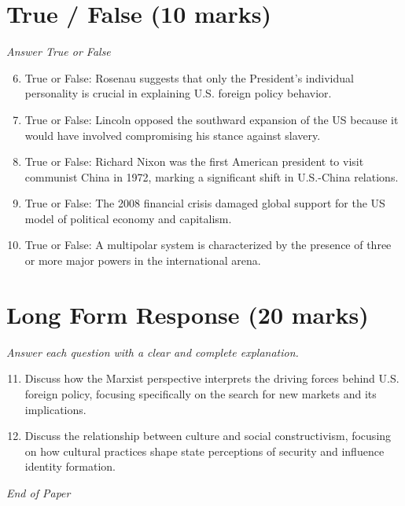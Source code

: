 \documentclass[12pt]{article}
\begin{document}
\section*{True / False (10 marks)}
\textit{Answer True or False}
\begin{enumerate}[label=\arabic*.]
\setcounter{enumi}{5}
\item True or False: Rosenau suggests that only the President's individual personality is crucial in explaining U.S. foreign policy behavior.
\item True or False: Lincoln opposed the southward expansion of the US because it would have involved compromising his stance against slavery.
\item True or False: Richard Nixon was the first American president to visit communist China in 1972, marking a significant shift in U.S.-China relations.
\item True or False: The 2008 financial crisis damaged global support for the US model of political economy and capitalism.
\item True or False: A multipolar system is characterized by the presence of three or more major powers in the international arena.
\end{enumerate}

\section*{Long Form Response (20 marks)}
\textit{Answer each question with a clear and complete explanation.}
\begin{enumerate}[label=\arabic*.]
\setcounter{enumi}{10}
\item Discuss how the Marxist perspective interprets the driving forces behind U.S. foreign policy, focusing specifically on the search for new markets and its implications.
\item Discuss the relationship between culture and social constructivism, focusing on how cultural practices shape state perceptions of security and influence identity formation.
\end{enumerate}

\vfill
\noindent\textit{End of Paper}
\end{document}
